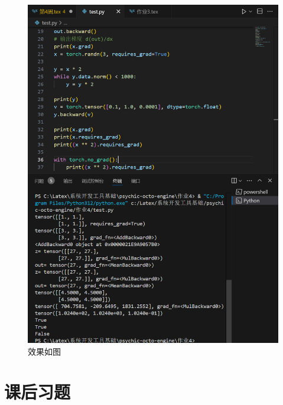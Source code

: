 \documentclass{ctexart}
\begin{document}
\begin{enumerate}
\begin{figure}[H]
    \includegraphics[width=14cm]{6ce332ebb8898a533effba33b7979268.png}
    \caption{效果如图}
    \label{fig:23}
    \end{figure}
\end{enumerate}


\section{课后习题}
\end{document}
